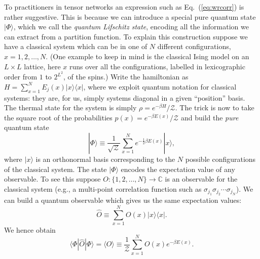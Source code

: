 \documentclass[twocolumn,lengthcheck,superscriptaddress]{revtex4-1}
\theoremstyle{definition}
\theoremstyle{remark}
\begin{document}
To practitioners in tensor networks an expression such as Eq.~(\ref{eq:wrcorr}) is rather suggestive. This is because we can introduce a special pure quantum state $|\Phi\rangle$, which we call the \emph{quantum Lifschitz state}, encoding all the information we can extract from a partition function. To explain this construction suppose we have a classical system which can be in one of $N$ different configurations, $x = 1, 2, \ldots, N$. (One example to keep in mind is the classical Ising model on an $L\times L$ lattice, here $x$ runs over all the configurations, labelled in lexicographic order from $1$ to $2^{L^2}$, of the spins.) Write the hamiltonian as $H = \sum_{x=1}^N E_j(x) |x\rangle\langle x|$, where we exploit quantum notation for classical systems: they are, for us, simply systems diagonal in a given ``position'' basis. The thermal state for the system is simply $\rho = e^{-\beta H}/\mathcal{Z}$. The trick is now to take the square root of the probabilities $p(x) = e^{-\beta E(x)}/\mathcal{Z}$ \cite{rudolph:2002a, aharonov:2003a} and build the \emph{pure} quantum state 
\begin{equation}
|\Phi\rangle \equiv \frac{1}{\sqrt{\mathcal{Z}}}\sum_{x=1}^N e^{-\frac12\beta E(x)}|x\rangle,
\end{equation}
where $|x\rangle$ is an orthonormal basis corresponding to the $N$ possible configurations of the classical system. The state $|\Phi\rangle$ encodes the expectation value of any observable. To see this suppose $O:\{1,2,\ldots, N\}\rightarrow \mathbb{C}$ is an observable for the classical system (e.g., a multi-point correlation function such as $\sigma_{j_1}\sigma_{j_2}\cdots \sigma_{j_N}$). We can build a quantum observable which gives us the same expectation values:
\begin{equation}
	\widehat{O} \equiv \sum_{x=1}^N O(x) |x\rangle\langle x|.
\end{equation}
We hence obtain 
\begin{equation}
\langle \Phi|\widehat{O}|\Phi\rangle = \langle O\rangle \equiv \frac{1}{\mathcal{Z}}\sum_{x=1}^N O(x) e^{-\beta E(x)}. 
\end{equation}
\end{document}

